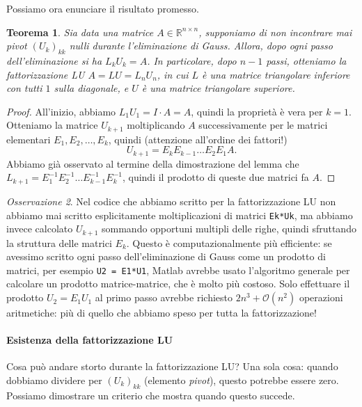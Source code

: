 \documentclass[a4paper]{report}
\newtheorem{theorem}{Teorema}[chapter]
\theoremstyle{definition}
\theoremstyle{remark}
\newtheorem{remark}[theorem]{Osservazione}
\begin{document}
Possiamo ora enunciare il risultato promesso.

\begin{theorem}
    Sia data una matrice $A\in\mathbb{R}^{n\times n}$, supponiamo di non incontrare mai pivot $(U_k)_{kk}$ nulli durante l'eliminazione di Gauss. Allora, dopo ogni passo dell'eliminazione si ha $L_k U_k = A$. In particolare, dopo $n-1$ passi, otteniamo la \emph{fattorizzazione LU} $A = LU = L_{n}U_{n}$, in cui $L$ è una matrice triangolare inferiore con tutti $1$ sulla diagonale, e $U$ è una matrice triangolare superiore.
\end{theorem}
\begin{proof}
    All'inizio, abbiamo $L_1 U_1 = I \cdot A = A$, quindi la proprietà è vera per $k=1$. Otteniamo la matrice $U_{k+1}$ moltiplicando $A$ successivamente per le matrici elementari $E_1, E_2,\dots, E_k$, quindi (attenzione all'ordine dei fattori!)
    \[
        U_{k+1} = E_k E_{k-1} \dots E_2 E_1 A.
    \]
    Abbiamo già osservato al termine della dimostrazione del lemma che $L_{k+1} = E_1^{-1} E_2^{-1} \dots E_{k-1}^{-1} E_k^{-1}$, quindi il prodotto di queste due matrici fa $A$.
\end{proof}

\begin{remark}
    Nel codice che abbiamo scritto per la fattorizzazione LU non abbiamo mai scritto esplicitamente moltiplicazioni di matrici \lstinline{Ek*Uk}, ma abbiamo invece calcolato $U_{k+1}$ sommando opportuni multipli delle righe, quindi sfruttando la struttura delle matrici $E_k$. Questo è computazionalmente più efficiente: se avessimo scritto ogni passo dell'eliminazione di Gauss come un prodotto di matrici, per esempio \lstinline{U2 = E1*U1}, Matlab avrebbe usato  l'algoritmo generale per calcolare un prodotto matrice-matrice, che è molto più costoso. Solo effettuare il prodotto $U_2 = E_1 U_1$ al primo passo avrebbe richiesto $2n^3 + \mathcal{O}(n^2)$ operazioni aritmetiche: più di quello che abbiamo speso per tutta la fattorizzazione!
\end{remark}

\paragraph{Esistenza della fattorizzazione LU}

Cosa può andare storto durante la fattorizzazione LU? Una sola cosa: quando dobbiamo dividere per $(U_k)_{kk}$ (elemento \emph{pivot}), questo potrebbe essere zero. Possiamo dimostrare un criterio che mostra quando questo succede.
\end{document}

